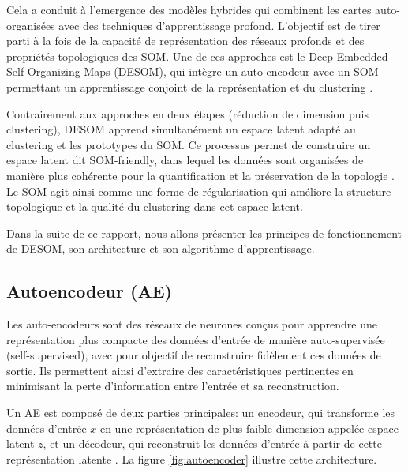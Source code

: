 \documentclass[12pt,a4paper]{report}
\begin{document}
Cela a conduit à l'emergence des modèles hybrides qui combinent les cartes auto-organisées avec des techniques d'apprentissage profond. L'objectif est de tirer parti à la fois de la capacité 
de représentation des réseaux profonds et des propriétés topologiques des SOM. Une de ces approches est le Deep Embedded Self-Organizing Maps (DESOM), qui intègre un auto-encodeur 
avec un SOM permettant un apprentissage conjoint de la représentation et du clustering \cite{DESOM}. 

Contrairement aux approches en deux étapes (réduction de dimension puis clustering), DESOM apprend simultanément un espace latent adapté au clustering et les prototypes du SOM. 
Ce processus permet de construire un espace latent dit SOM-friendly, dans lequel les données sont organisées de manière plus cohérente pour la quantification et la préservation 
de la topologie \cite{DESOM}. Le SOM agit ainsi comme une forme de régularisation qui améliore la structure topologique et la qualité du clustering dans cet espace latent.

Dans la suite de ce rapport, nous allons présenter les principes de fonctionnement de DESOM, son architecture et son algorithme d'apprentissage.

\subsection{Autoencodeur (AE)}

Les auto-encodeurs sont des réseaux de neurones conçus pour apprendre une représentation plus compacte des données d'entrée de manière auto-supervisée (self-supervised),
avec pour objectif de reconstruire fidèlement ces données de sortie.
Ils permettent ainsi d'extraire des caractéristiques pertinentes en minimisant la perte d'information entre l'entrée et sa reconstruction.

Un AE est composé de deux parties principales: un encodeur, qui transforme les données d'entrée $x$ en une représentation de plus faible dimension appelée espace latent $z$,
et un décodeur, qui reconstruit les données d'entrée à partir de cette représentation latente \cite{DESOM}. La figure \ref{fig:autoencoder} illustre cette architecture.
\end{document}

